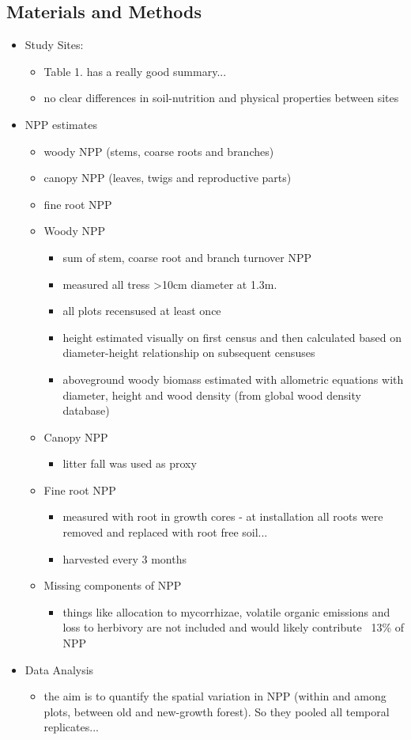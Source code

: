 \subsection*{Materials and Methods}
\begin{itemize}
	\item Study Sites:
	\begin{itemize}
		\item Table 1. has a really good summary...
		\item no clear differences in soil-nutrition and physical properties between sites
	\end{itemize}
	\item NPP estimates
	\begin{itemize}
		\item woody NPP (stems, coarse roots and branches)
		\item canopy NPP (leaves, twigs and reproductive parts)
		\item fine root NPP	
		\item Woody NPP
		\begin{itemize}
			\item sum of stem, coarse root and branch turnover NPP
			\item measured all tress >10cm diameter at 1.3m.
			\item all plots recensused at least once
			\item height estimated visually on first census and then calculated based on diameter-height relationship on subsequent censuses
			\item aboveground woody biomass estimated with allometric equations with diameter, height and wood density (from global wood density database)
		\end{itemize}
		\item Canopy NPP
		\begin{itemize}
			\item litter fall was used as proxy
		\end{itemize}
		\item Fine root NPP
		\begin{itemize}
			\item measured with root in growth cores - at installation all roots were removed and replaced with root free soil...
			\item harvested every 3 months
		\end{itemize}
		\item Missing components of NPP
		\begin{itemize}
			\item things like allocation to mycorrhizae, volatile organic emissions and loss to herbivory are not included and would likely contribute ~13\% of NPP
		\end{itemize}
	\end{itemize}
	\item Data Analysis
	\begin{itemize}
		\item the aim is to quantify the spatial variation in NPP (within and among plots, between old and new-growth forest). So they pooled all temporal replicates...	
	\end{itemize}
\end{itemize}
